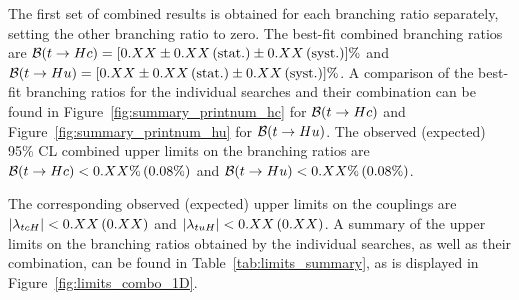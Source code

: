The first set of combined results is obtained for each branching ratio separately, setting the other branching ratio to zero.
The best-fit combined branching ratios are $\mathcal{B}(t\to Hc)=[0.XX \pm 0.XX\,(\mathrm{ stat.}) \pm 0.XX\,(\mathrm{ syst.})]\%$ and 
$\mathcal{B}(t\to Hu)=[0.XX \pm 0.XX\,(\mathrm{ stat.}) \pm 0.XX\,(\mathrm{ syst.})]\%$.  
A comparison of the best-fit branching ratios for the individual searches and their combination can be found in Figure~\ref{fig:summary_printnum_hc} 
for $\mathcal{B}(t\to Hc)$ and Figure~\ref{fig:summary_printnum_hu} for $\mathcal{B}(t\to Hu)$.
The observed (expected) 95\% CL combined upper limits on the branching ratios are 
$\mathcal{B}(t\to Hc)<0.XX\%\,(0.08\%)$ and $\mathcal{B}(t\to Hu)<0.XX\%\,(0.08\%)$. 

The corresponding observed (expected) upper limits on the couplings are $|\lambda_{tcH}|<0.XX\,(0.XX)$ and $|\lambda_{tuH}|<0.XX\,(0.XX)$.
A summary of the upper limits on the branching ratios obtained by the individual searches, as well as their combination, 
can be found in Table~\ref{tab:limits_summary}, as is displayed in Figure~\ref{fig:limits_combo_1D}.

